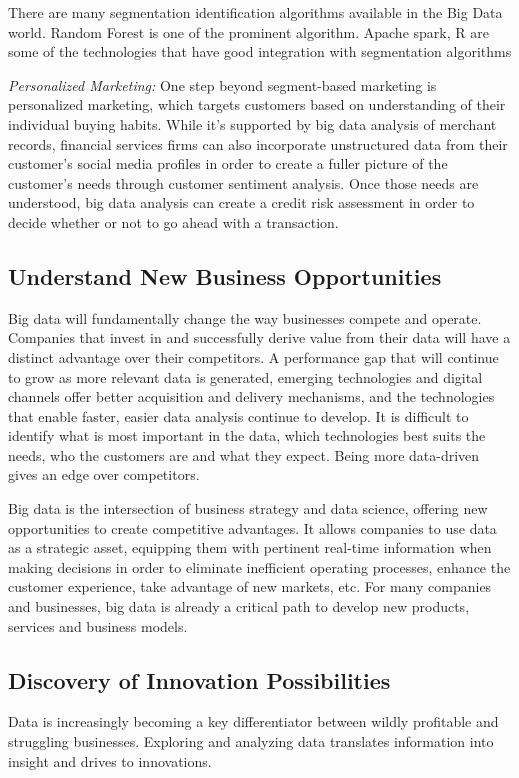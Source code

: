 \documentclass[sigconf]{acmart}
\begin{document}
There are many segmentation identification algorithms available in the Big Data world.  Random Forest is one of the prominent algorithm. Apache spark, R are some of the technologies that have good integration with segmentation algorithms

\textit{Personalized Marketing:} One step beyond segment-based marketing is personalized marketing, which targets customers based on understanding of their individual buying habits. While it's supported by big data analysis of merchant records, financial services firms can also incorporate unstructured data from their customer's social media profiles in order to create a fuller picture of the customer's needs through customer sentiment analysis. Once those needs are understood, big data analysis can create a credit risk assessment in order to decide whether or not to go ahead with a transaction\cite{5-big-data-use-cases-in-banking-and-financial-services}.

    
\subsection{Understand New Business Opportunities}
Big data will fundamentally change the way businesses
compete and operate. Companies that invest in and
successfully derive value from their data will have a distinct advantage over their competitors. A performance gap that will continue to grow as more relevant data is generated, emerging technologies and digital channels offer better acquisition and delivery mechanisms, and the technologies that enable faster, easier data analysis continue to develop. It is difficult to identify what is most important in the data, which technologies best suits the needs, who the customers are and what they expect. Being more data-driven gives an edge over competitors\cite{bigdata-ey}.

Big data is the intersection of business strategy and data science, offering new opportunities to create competitive advantages. It allows companies to use data as a strategic asset, equipping them with pertinent real-time information when making decisions in order to eliminate inefficient operating processes, enhance the customer experience, take advantage of new markets, etc.
For many companies and businesses, big data is already a critical path to develop new products, services and business models\cite{accenture-next-generation-financial}.

\subsection{Discovery of Innovation Possibilities}
Data is increasingly becoming a key differentiator between wildly profitable and struggling businesses. Exploring and analyzing data translates information into insight and drives to innovations\cite{bigdata-innovations}.
\end{document}
